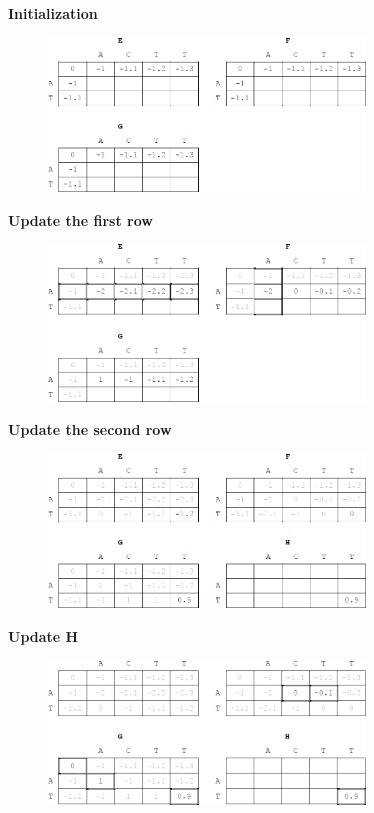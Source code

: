 \textbf{Initialization}
\begin{figure}[H]
  \centering
      \includegraphics[width=0.75\textwidth]{fig03/affine_dp_init.png}
\end{figure}
\null \medskip 

\textbf{Update the first row}
\begin{figure}[H]
  \centering
      \includegraphics[width=0.75\textwidth]{fig03/affine_dp_first_row.png}
\end{figure}
\null \medskip 

\textbf{Update the second row}
\begin{figure}[H]
  \centering
      \includegraphics[width=0.75\textwidth]{fig03/affine_dp_update_h.png}
\end{figure}
\null \medskip 

\textbf{Update H}
\begin{figure}[H]
  \centering
      \includegraphics[width=0.75\textwidth]{fig03/affine_dp_backtrack.png}
\end{figure}
\null \medskip 

